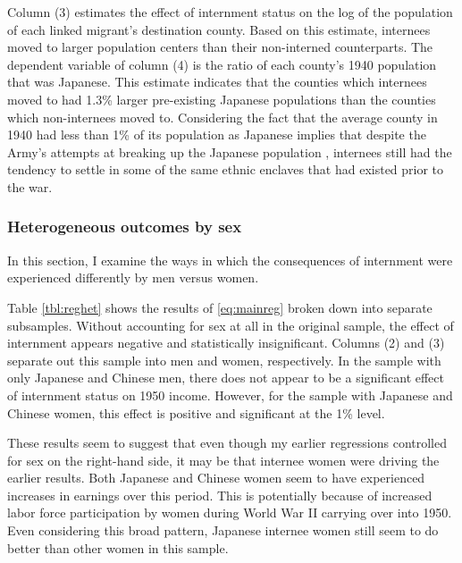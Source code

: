 \documentclass[12pt]{article}
\begin{document}
Column (3) estimates the effect of internment status on the log of the population
of each linked migrant's destination county.
Based on this estimate, internees moved to larger population centers
than their non-interned counterparts.
The dependent variable of column (4) is the ratio of each county's 1940
population that was Japanese.
This estimate indicates that the counties which internees moved to
had 1.3\% larger pre-existing Japanese populations
than the counties which non-internees moved to.
Considering the fact that the average county in 1940
had less than 1\% of its population as Japanese implies that
despite the Army's attempts at breaking up the Japanese population
,
internees still had the tendency to settle
in some of the same ethnic enclaves that had existed prior to the war.
\subsubsection{Heterogeneous outcomes by sex}
\label{sec:org9f2ed87}

In this section, I examine the ways in which the consequences of internment
were experienced differently by men versus women.



Table \ref{tbl:reghet} shows the results of \ref{eq:mainreg}
broken down into separate subsamples.
Without accounting for sex at all in the original sample,
the effect of internment appears negative and statistically insignificant.
Columns (2) and (3) separate out this sample into men and women, respectively.
In the sample with only Japanese and Chinese men,
there does not appear to be a significant effect of internment status on 1950 income.
However, for the sample with Japanese and Chinese women,
this effect is positive and significant at the 1\% level.



These results seem to suggest that even though my earlier regressions
controlled for sex on the right-hand side,
it may be that internee women were driving the earlier results.
Both Japanese and Chinese women seem to have experienced increases in earnings
over this period.
This is potentially because of increased labor force participation by women
during World War II carrying over into 1950.
Even considering this broad pattern,
Japanese internee women still seem to do better than other women in this sample.
\end{document}
